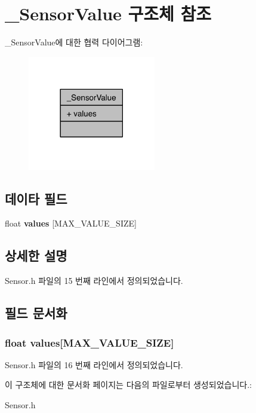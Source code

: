 \hypertarget{struct___sensor_value}{\section{\-\_\-\-Sensor\-Value 구조체 참조}
\label{struct___sensor_value}
}


\-\_\-\-Sensor\-Value에 대한 협력 다이어그램\-:\nopagebreak
\begin{figure}[H]
\begin{center}
\leavevmode
\includegraphics[width=158pt]{struct___sensor_value__coll__graph}
\end{center}
\end{figure}
\subsection*{데이타 필드}
\begin{DoxyCompactItemize}
\item 
\hypertarget{struct___sensor_value_ab4128bfeaac6d3aef2236ea92ae99d72}{float {\bfseries values} \mbox{[}M\-A\-X\-\_\-\-V\-A\-L\-U\-E\-\_\-\-S\-I\-Z\-E\mbox{]}}\label{struct___sensor_value_ab4128bfeaac6d3aef2236ea92ae99d72}

\end{DoxyCompactItemize}


\subsection{상세한 설명}


Sensor.\-h 파일의 15 번째 라인에서 정의되었습니다.



\subsection{필드 문서화}
\hypertarget{struct___sensor_value_ab4128bfeaac6d3aef2236ea92ae99d72}{
\subsubsection[{values}]{\setlength{\rightskip}{0pt plus 5cm}float values\mbox{[}M\-A\-X\-\_\-\-V\-A\-L\-U\-E\-\_\-\-S\-I\-Z\-E\mbox{]}}}\label{struct___sensor_value_ab4128bfeaac6d3aef2236ea92ae99d72}


Sensor.\-h 파일의 16 번째 라인에서 정의되었습니다.



이 구조체에 대한 문서화 페이지는 다음의 파일로부터 생성되었습니다.\-:\begin{DoxyCompactItemize}
\item 
Sensor.\-h\end{DoxyCompactItemize}

